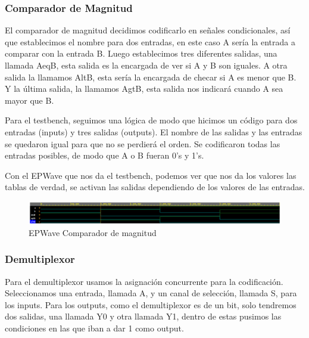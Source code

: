 \documentclass[12pt]{article}  %
\begin{document}
\subsubsection*{Comparador de Magnitud}
El comparador de magnitud decidimos codificarlo en señales condicionales, así que establecimos el nombre para dos entradas, en este caso A sería la entrada a comparar con la entrada B. Luego establecimos tres diferentes salidas, una llamada AeqB, esta salida es la encargada de ver si A y B son iguales. A otra salida la llamamos AltB, esta sería la encargada de checar si A es menor que B. Y la última salida, la llamamos AgtB, esta salida nos indicará cuando A sea mayor que B.



Para el testbench, seguimos una lógica de modo que hicimos un código para dos entradas (inputs) y tres salidas (outputs). El nombre de las salidas y las entradas se quedaron igual para que no se perdierá el orden. Se codificaron todas las entradas posibles, de modo que A o B fueran 0's y 1's.


Con el EPWave que nos da el testbench, podemos ver que nos da los valores las tablas de verdad, se activan las salidas dependiendo de los valores de las entradas.

\begin{figure}[!ht]
    \centering
    \caption{EPWave Comparador de magnitud}
    \includegraphics[width=1\linewidth]{Imagenes/waves/comp-mag.png}
\end{figure}

\subsubsection*{Demultiplexor}

Para el demultiplexor usamos la asignación concurrente para la codificación. Seleccionamos una entrada, llamada A, y un canal de selección, llamada S, para los inputs. Para los outputs, como el demultiplexor es de un bit, solo tendremos dos salidas, una llamada Y0 y otra llamada Y1, dentro de estas pusimos las condiciones en las que iban a dar 1 como output.
\end{document}
